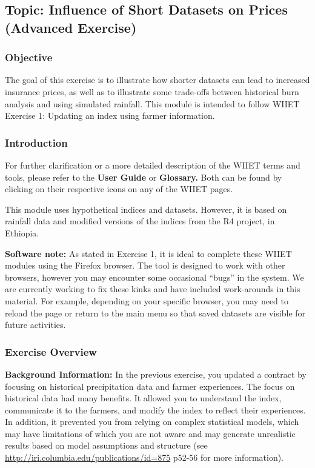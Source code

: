 \documentclass[letterpaper,10pt,english]{sphinxmanual}
\begin{document}
\subsection{Topic: Influence of Short Datasets on Prices (Advanced Exercise)}
\label{wiiet/wiiet_influenceshortdatasets_Web:topic-influence-of-short-datasets-on-prices-advanced-exercise}

\subsubsection{Objective}
\label{wiiet/wiiet_influenceshortdatasets_Web:objective}
The goal of this exercise is to illustrate how shorter datasets can lead to increased insurance prices, as well as to illustrate some trade-offs between historical burn analysis and using simulated rainfall. This module is intended to follow WIIET Exercise 1: Updating an index using farmer information.


\subsubsection{Introduction}
\label{wiiet/wiiet_influenceshortdatasets_Web:introduction}
For further clarification or a more detailed description of the WIIET terms and tools, please refer to the \textbf{User Guide} or \textbf{Glossary.} Both can be found by clicking on their respective icons on any of the WIIET pages.

This module uses hypothetical indices and datasets. However, it is based on rainfall data and modified versions of the indices from the R4 project, in Ethiopia.

\textbf{Software note:} As stated in Exercise 1, it is ideal to complete these WIIET modules using the Firefox browser. The tool is designed to work with other browsers, however you may encounter some occasional ``bugs'' in the system. We are currently working to fix these kinks and have included work-arounds in this material. For example, depending on your specific browser, you may need to reload the page or return to the main menu so that saved datasets are visible for future activities.


\subsubsection{Exercise Overview}
\label{wiiet/wiiet_influenceshortdatasets_Web:exercise-overview}
\textbf{Background Information:} In the previous exercise, you updated a contract by focusing on historical precipitation data and farmer experiences. The focus on historical data had many benefits. It allowed you to understand the index, communicate it to the farmers, and modify the index to reflect their experiences. In addition, it prevented you from relying on complex statistical models, which may have limitations of which you are not aware and may generate unrealistic results based on model assumptions and structure (see \href{http://iri.columbia.edu/publications/id=875}{http://iri.columbia.edu/publications/id=875} p52-56 for more information).
\end{document}
